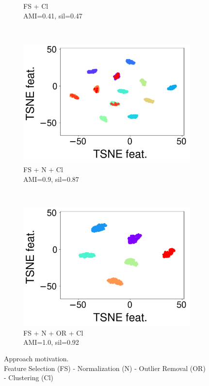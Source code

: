 \begin{figure}[t]
\begin{subfigure}[t]{0.23\columnwidth}
        \caption{FS + Cl\\ \scriptsize{AMI=0.41, sil=0.47}}
        \label{clustering-fig:ca4}
    \end{subfigure}
    ~
    \begin{subfigure}[t]{0.2\columnwidth}
        \centering
        \includegraphics[scale=.15]{chapters/data-centric/unsupervised/img/ft_sc_cl.pdf}
        \caption{FS + N + Cl\\ \scriptsize{AMI=0.9, sil=0.87}}
        \label{clustering-fig:ca5}
    \end{subfigure}
    ~
    \begin{subfigure}[t]{0.28\columnwidth}
        \centering
        \includegraphics[scale=.15]{chapters/data-centric/unsupervised/img/ft_sc_ou_cl.pdf}
        \caption{FS + N + OR + Cl\\ \scriptsize{AMI=1.0, sil=0.92}}
        \label{clustering-fig:ca6}
    \end{subfigure}
    \caption{Approach motivation. \\
    \small{Feature Selection (FS) - Normalization (N) - Outlier Removal (OR) - Clustering (Cl)}}
    \label{clustering-fig:clusterings}
\end{figure}

